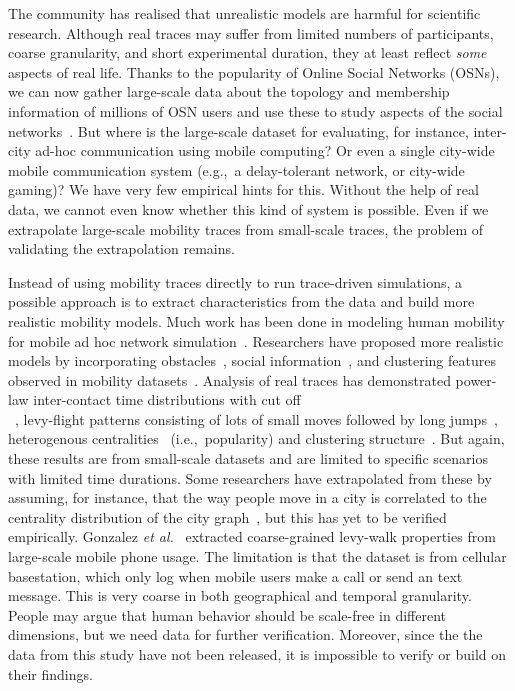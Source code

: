 \documentclass{sig-alternate-10pt}
\begin{document}
The community has realised that unrealistic models are harmful for
scientific research.  Although real traces may suffer from limited
numbers of participants, coarse granularity, and short experimental
duration, they at least reflect \emph{some} aspects of real life.
Thanks to the popularity of Online Social Networks (OSNs), we can now
gather large-scale data about the topology and membership information
of millions of OSN users and use these to study aspects of the social
networks~\cite{mislove-2007-socialnetworks,lewis:facebook}. But where
is the large-scale dataset for evaluating, for instance, inter-city
ad-hoc communication using mobile computing?  Or even a single
city-wide mobile communication system (e.g.,~a delay-tolerant network, or
city-wide gaming)?  We have very few empirical hints for this.
Without the help of real data, we cannot even know whether this kind
of system is possible.  Even if we extrapolate large-scale
mobility traces from small-scale traces, the problem of validating the
extrapolation remains.

Instead of using mobility traces directly to run trace-driven
simulations, a possible approach is to extract characteristics from
the data and build more realistic mobility models.  Much work has been
done in modeling human mobility for mobile ad hoc network
simulation~\cite{Camp02asurvey}.  Researchers have proposed more
realistic models by incorporating obstacles~\cite{jardosh03mobility},
social information~\cite{musolesi:models}, and clustering features
observed in mobility datasets~\cite{comsnets09piorkowski}.  Analysis
of real traces has demonstrated power-law inter-contact time
distributions with cut
off\\~\cite{psn-tmc07,Karagiannis07mobile}, levy-flight
patterns consisting of lots of small moves followed by long
jumps~\cite{rhee:levymobility}, heterogenous
centralities~\cite{freeman1977} (i.e.,~popularity) and clustering
structure~\cite{psn-mobihoc}.  But again, these results are from
small-scale datasets and are limited to specific scenarios with
limited time durations.  Some researchers have extrapolated from these
by assuming, for instance, that the way people move in a city is
correlated to the centrality distribution of the city
graph~\cite{strano07centrality}, but this has yet to be verified
empirically.  Gonzalez \emph{et al.}~\cite{gonzalezNature08} extracted
coarse-grained levy-walk properties from large-scale mobile phone
usage.  The limitation is that the dataset is from cellular
basestation, which only log when mobile users make a call or send an
text message.  This is very coarse in both geographical and temporal
granularity.  People may argue that human behavior should be
scale-free in different dimensions, but we need data for further
verification. Moreover, since the the data from this study have not
been released, it is impossible to verify or build on their findings.
\end{document}
